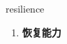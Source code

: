 
\begin{frame}
{\huge resilience}
\begin{center}
\begin{enumerate}\Large
  \item \textbf{恢复能力}
\end{enumerate}
\end{center}
\end{frame}

